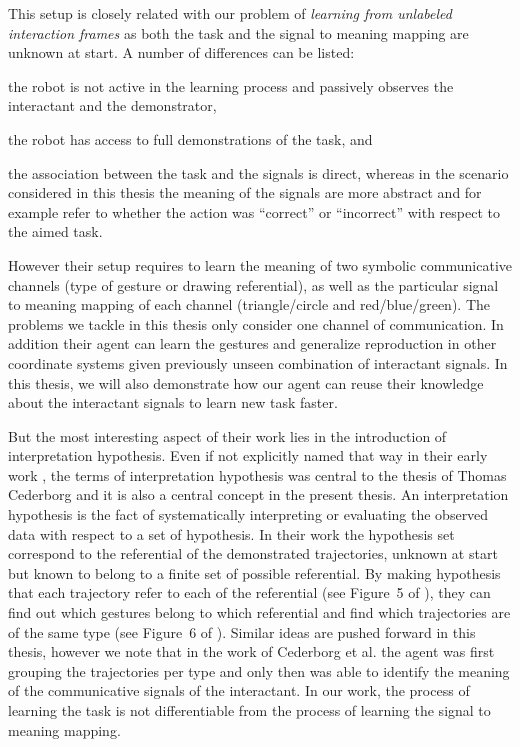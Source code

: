 This setup is closely related with our problem of \emph{learning from unlabeled interaction frames} as both the task and the signal to meaning mapping are unknown at start. A number of differences can be listed: \begin{inparaenum}[a)] \item the robot is not active in the learning process and passively observes the interactant and the demonstrator, \item  the robot has access to full demonstrations of the task, and \item the association between the task and the signals is direct, whereas in the scenario considered in this thesis the meaning of the signals are more abstract and for example refer to whether the action was ``correct'' or ``incorrect'' with respect to the aimed task. \end{inparaenum} However their setup requires to learn the meaning of two symbolic communicative channels (type of gesture or drawing referential), as well as the particular signal to meaning mapping of each channel (triangle/circle and red/blue/green). The problems we tackle in this thesis only consider one channel of communication. In addition their agent can learn the gestures and generalize reproduction in other coordinate systems given previously unseen combination of interactant signals. In this thesis, we will also demonstrate how our agent can reuse their knowledge about the interactant signals to learn new task faster.

But the most interesting aspect of their work lies in the introduction of interpretation hypothesis. Even if not explicitly named that way in their early work \cite{cederborg2011imitating}, the terms of interpretation hypothesis was central to the thesis of Thomas Cederborg \cite{cederborg2014thesis} and it is also a central concept in the present thesis. An interpretation hypothesis is the fact of systematically interpreting or evaluating the observed data with respect to a set of hypothesis. In their work the hypothesis set correspond to the referential of the demonstrated trajectories, unknown at start but known to belong to a finite set of possible referential. By making hypothesis that each trajectory refer to each of the referential (see Figure~5 of \cite{cederborg2011imitating}), they can find out which gestures belong to which referential and find which trajectories are of the same type (see Figure~6 of \cite{cederborg2011imitating}). Similar ideas are pushed forward in this thesis, however we note that in the work of Cederborg et al. the agent was first grouping the trajectories per type and only then was able to identify the meaning of the communicative signals of the interactant. In our work, the process of learning the task is not differentiable from the process of learning the signal to meaning mapping.

